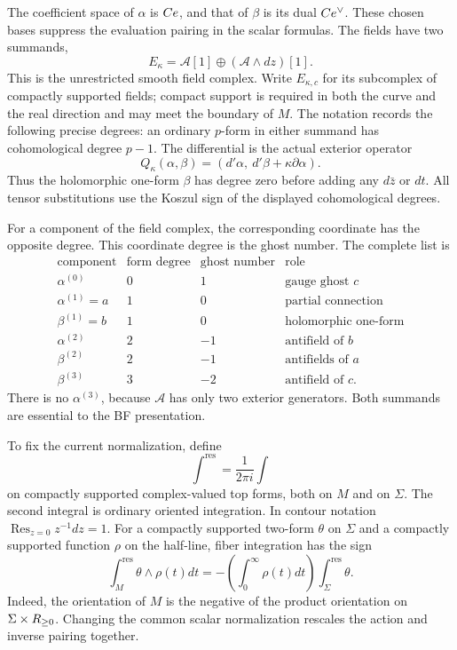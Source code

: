 The coefficient space of $\alpha$ is $C e$, and that of $\beta$ is
its dual $C e^\vee$.  These chosen bases suppress the evaluation
pairing in the scalar formulas.  The fields have two summands,
\[
 E_\kappa=\mathcal A[1]\oplus(\mathcal A\wedge dz)[1].
\]
This is the unrestricted smooth field complex.  Write $E_{\kappa,c}$
for its subcomplex of compactly supported fields; compact support is
required in both the curve and the real direction and may meet the
boundary of $M$.
The notation records the following precise degrees: an ordinary
$p$-form in either summand has cohomological degree $p-1$.
The differential is the actual exterior operator
\[
 Q_\kappa(\alpha,\beta)
   =(d'\alpha,\ d'\beta+\kappa\partial\alpha).
\]
Thus the holomorphic one-form $\beta$ has degree zero before adding
any $d\bar z$ or $dt$.  All tensor substitutions use the Koszul sign
of the displayed cohomological degrees.

For a component of the field complex, the corresponding coordinate
has the opposite degree.  This coordinate degree is the ghost number.
The complete list is
\[
\begin{array}{c|c|c|l}
 \text{component}&\text{form degree}&\text{ghost number}&\text{role}\\\hline
 \alpha^{(0)}&0&1&\text{gauge ghost }c\\
 \alpha^{(1)}=a&1&0&\text{partial connection}\\
 \beta^{(1)}=b&1&0&\text{holomorphic one-form}\\
 \alpha^{(2)}&2&-1&\text{antifield of }b\\
 \beta^{(2)}&2&-1&\text{antifields of }a\\
 \beta^{(3)}&3&-2&\text{antifield of }c .
\end{array}
\]
There is no $\alpha^{(3)}$, because $\mathcal A$ has only two
exterior generators.  Both summands are essential to the BF presentation.

To fix the current normalization, define
\[
 \int^{\mathrm{res}}=\frac1{2\pi i}\int
\]
on compactly supported complex-valued top forms, both on $M$ and on $\Sigma$.
The second integral is ordinary oriented integration.  In contour
notation $\operatorname{Res}_{z=0}z^{-1}dz=1$.
For a compactly supported two-form $\theta$ on $\Sigma$ and a
compactly supported function $\rho$ on the half-line, fiber integration
has the sign
\[
 \int_M^{\mathrm{res}}\theta\wedge\rho(t)dt
 =-\left(\int_0^\infty\rho(t)dt\right)
                  \int_\Sigma^{\mathrm{res}}\theta.
\]
Indeed, the orientation of $M$ is the negative of the product
orientation on $\Sigma\times R_{\ge0}$.
Changing the common scalar normalization rescales the action and
inverse pairing together.

